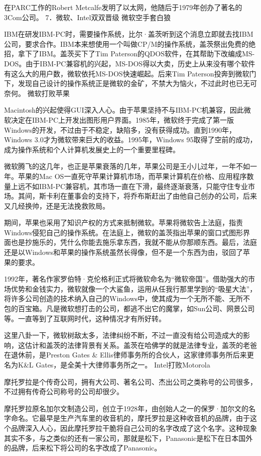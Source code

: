 \documentclass[12pt,UTF8]{ctexbook}
\begin{document}
在PARC工作的Robert Metcalfe发明了以太网，他随后于1979年创办了著名的3Com公司。
7．微软、Intel双双晋级
微软空手套白狼

IBM在研发IBM-PC时，需要操作系统，比尔·盖茨听到这个消息立即就去找IBM公司，要求合作。IBM本来想使用一个叫做CP/M的操作系统，盖茨祭出免费的绝招，拿下了IBM。盖茨买下了Tim Paterson的QDOS软件，在其帮助下改编成MS-DOS。由于IBM-PC兼容机的兴起，MS-DOS得以大卖，历史上从来没有哪个软件有这么大的用户数，微软依托MS-DOS快速崛起。后来Tim Paterson投奔到微软门下，发现自己设计的操作系统正是微软的金矿，不禁大为恼火，不过此时也已无可奈何。
微软打败苹果

Macintosh的兴起使得GUI深入人心。由于苹果坚持不与IBM-PC机兼容，因此微软决定在IBM-PC上开发出图形用户界面。1985年，微软终于完成了第一版Windows的开发，不过由于不稳定，缺陷多，没有获得成功。直到1990年，Windows 3.0才为微软带来巨大的收益。1995年，Windows 95取得了空前的成功，成为操作系统和个人计算机发展史上的一个重要里程碑。

微软腾飞的这几年，也正是苹果衰落的几年，苹果公司是王小儿过年，一年不如一年。苹果的Mac OS一直死守苹果计算机市场，而苹果计算机在价格、应用程序数量上远不如IBM-PC兼容机，其市场一直在下滑，最终逐渐衰落，只能守住专业市场。其间，斯卡利在董事会的支持下，将乔布斯赶出了由他自己创办的公司，后来又几经换帅，还是无法挽救败局。

期间，苹果也采用了知识产权的方式来抵制微软。苹果将微软告上法庭，指责Windows侵犯自己的操作系统。在法庭上，微软的盖茨指出苹果的窗口式图形界面也是抄施乐的，凭什么你能去施乐拿东西，我就不能从你那顺东西。最后，法庭还是以Windows和苹果的操作系统虽然长得像，但不是一个东西为由，驳回了苹果的要求。

1992年，著名作家罗伯特·克伦格利正式将微软命名为“微软帝国”。借助强大的市场优势和金钱实力，微软就像一个大鲨鱼，运用从任我行那里学到的“吸星大法”，将许多公司创造的技术纳入自己的Windows中，使其成为一个无所不能、无所不包的百宝箱。凡是微软想打击的公司，都逃不出它的魔掌，如Sun公司、网景公司等。一直等到了互联网时代，这种情况才有所好转。

这里八卦一下，微软树敌太多，法律纠纷不断，不过一直没有给公司造成大的影响，这估计和盖茨的法律背景有关系。盖茨在哈佛学的就是法律专业，盖茨的老爸在退休前，是Preston Gates \& Ellis律师事务所的合伙人，这家律师事务所后来更名为K\&L Gates，是全美十大律师事务所之一。
Intel打败Motorola

摩托罗拉是个传奇公司，拥有大公司、著名公司、杰出公司之类称号的公司很多，不过拥有传奇公司称号的公司却很少。

摩托罗拉原名加尔文制造公司，创立于1928年，由创始人之一的保罗·加尔文的名字命名。它最早是生产汽车里的收音机的，摩托罗拉是这种收音机的品牌，由于这个品牌深入人心，因此摩托罗拉干脆将自己公司的名字改成了这个名字。这种现象其实不多，与之类似的还有一家公司，那就是松下，Panasonic是松下在日本国外的品牌，后来松下将公司的名字改成了Panasonic。
\end{document}
